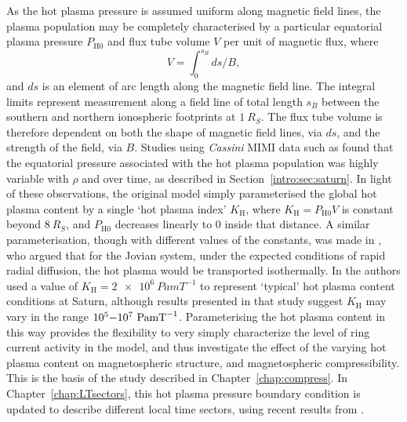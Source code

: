As the hot plasma pressure is assumed uniform along magnetic field lines, the plasma population may be completely characterised by a particular equatorial plasma pressure $P_\mathrm{H0}$ and flux tube volume $V$ per unit of magnetic flux, where
\begin{equation}\label{intro:eq:ftv}
V = \int_{0}^{s_{B}} ds/B,
\end{equation}
and $ds$ is an element of arc length along the magnetic field line. The integral limits represent measurement along a field line of total length $s_B$ between the southern and northern ionospheric footprints at $\SI{1}{R_S}$. The flux tube volume is therefore dependent on both the shape of magnetic field lines, via $ds$, and the strength of the field, via $B$. Studies using \textit{Cassini} MIMI data such as \citet{sergis2007} found that the equatorial pressure associated with the hot plasma population was highly variable with $\rho$ and over time, as described in Section~\ref{intro:sec:saturn}. In light of these observations, the original \citet{achilleos2010a} model simply parameterised the global hot plasma content by a single `hot plasma index' $K_\mathrm{H}$, where $ K_\mathrm{H}= P_\mathrm{H0}V$ is constant beyond $\SI{8}{R_S}$, and $P_\mathrm{H0}$ decreases linearly to 0 inside that distance. A similar parameterisation, though with different values of the constants, was made in \citet{caudal1986}, who argued that for the Jovian system, under the expected conditions of rapid radial diffusion, the hot plasma would be transported isothermally. In \citet{achilleos2010a} the authors used a value of $K_\mathrm{H} = \SI{2e6}{Pa m T^{-1}}$ to represent `typical' hot plasma content conditions at Saturn, although results presented in that study suggest $K_\mathrm{H}$ may vary in the range $10^5{\--}10^7~\si{Pa m T^{-1}}$. Parameterising the hot plasma content in this way provides the flexibility to very simply characterize the level of ring current activity in the model, and thus investigate the effect of the varying hot plasma content on magnetospheric structure, and magnetospheric compressibility. This is the basis of the study described in Chapter~\ref{chap:compress}. In Chapter~\ref{chap:LTsectors}, this hot plasma pressure boundary condition is updated to describe different local time sectors, using recent results from \citet{sergis2017}.

